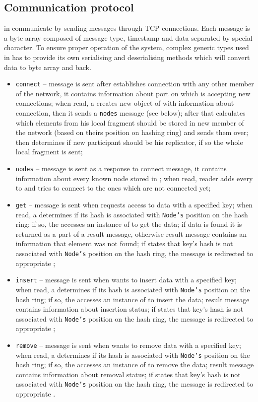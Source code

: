     \subsection{Communication protocol}
        \Nodes in \DHTS communicate by sending messages through TCP connections. 
        Each message is a byte array composed of message type, timestamp and data separated by special character. 
        To ensure proper operation of the system, complex generic types used in \PHT has to provide its own serialising and deserialising methods which will convert data to byte array and back. 
        \begin{itemize}
            \item \texttt{connect} -- message is sent after \Node establishes connection with any other member of the network, it contains information about port on which \Node is accepting new connections; when read, a \Node creates new object of \KnownNode with information about connection, then it sends a \texttt{nodes} message (see below); after that \Node calculates which elements from his local \PHT fragment should be stored in new member of the network (based on theirs position on hashing ring) and sends them over; then \Node determines if new participant should be his replicator, if so the whole local \PHT fragment is sent;
            \item \texttt{nodes} -- message is sent as a response to connect message, it contains information about every known node stored in \NodesMap; when read, reader adds every \Node to \NodesMap and tries to connect to the ones which are not connected yet;
            \item \texttt{get} -- message is sent when \Node requests access to data with a specified key; when read, a \Node determines if its hash is associated with \texttt{Node's} position on the hash ring; if so, the \Node accesses an instance of \PHT to get the data; if data is found it is returned as a part of a result message, otherwise result message contains an information that element was not found; if \Node states that key's hash is not associated with \texttt{Node's} position on the hash ring, the message is redirected to appropriate \Node;
            \item \texttt{insert} -- message is sent when \Node wants to insert data with a specified key; when read, a \Node determines if its hash is associated with \texttt{Node's} position on the hash ring; if so, the \Node accesses an instance of \PHT to insert the data; result message contains information about insertion status; if \Node states that key's hash is not associated with \texttt{Node's} position on the hash ring, the message is redirected to appropriate \Node;
            \item \texttt{remove} -- message is sent when \Node wants to remove data with a specified key; when read, a \Node determines if its hash is associated with \texttt{Node's} position on the hash ring; if so, the \Node accesses an instance of \PHT to remove the data; result message contains information about removal status; if \Node states that key's hash is not associated with \texttt{Node's} position on the hash ring, the message is redirected to appropriate \Node.
        \end{itemize}
        

